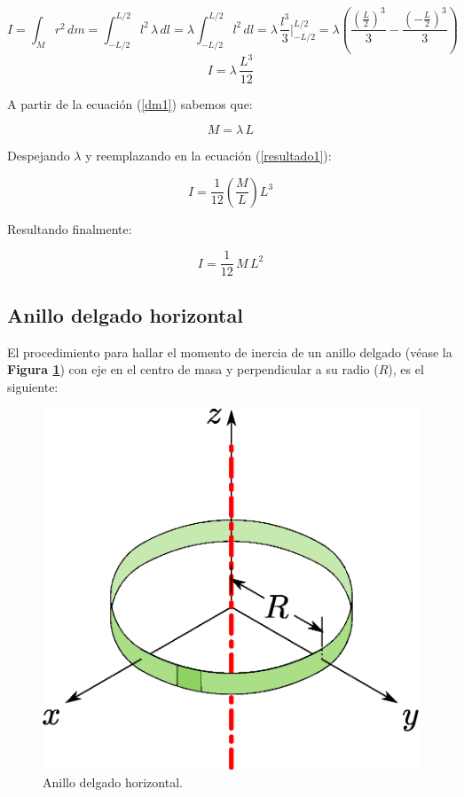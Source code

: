 \documentclass[letter,oneside,11pt]{article}
\begin{document}
\begin{equation*}
    I = \int_{M} r^2\, dm = \int_{-L/2}^{L/2} l^2\, \lambda\, dl = \lambda \int_{-L/2}^{L/2} l^2\, dl = \lambda\, \frac{l^3}{3} \Biggr|_{-L/2}^{L/2} = \lambda \left( \frac{(\frac{L}{2})^3}{3} - \frac{(-\frac{L}{2})^3}{3} \right)
\end{equation*}
\begin{equation}
    I = \lambda\, \frac{L^3}{12}
\label{resultado1}
\end{equation}

A partir de la ecuación (\ref{dm1}) sabemos que:

\begin{equation*}
    M = \lambda\, L
\end{equation*}

Despejando $\lambda$ y reemplazando en la ecuación (\ref{resultado1}):

\begin{equation*}
    I = \frac{1}{12} \left( \frac{M}{L} \right) L^3
\end{equation*}

Resultando finalmente:

\begin{equation}
    I = \frac{1}{12}\, M\, L^2
\end{equation}

\subsection{Anillo delgado horizontal}
El procedimiento para hallar el momento de inercia de un anillo delgado (véase
la \textbf{Figura \ref{figura7}}) con eje en el centro de masa y perpendicular a
su radio ($R$), es el siguiente:

\begin{figure}
\centering
\includegraphics[scale=0.5]{resources/f7.eps}
\caption{Anillo delgado horizontal.}
\label{figura7}
\end{figure}
\end{document}
